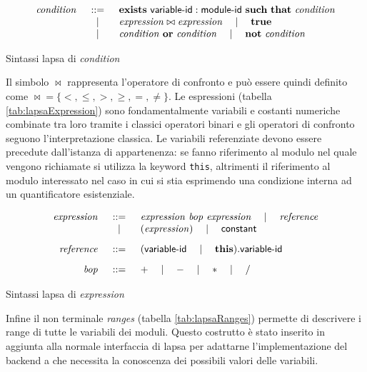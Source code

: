 \begin{table}[htbp!] %
$$
\begin{array}{rcl}
	\mathit{condition} &::=& \mathbf{exists} \mbox{ } {\sf variable}\textrm{-}{\sf id}:{\sf module}\textrm{-}{\sf id} \mbox{ } \mathbf{such}\mbox{ }\mathbf{that} \mbox{ } \mathit{condition} \\
		& \quad\mid\quad & \mathit{expression} \bowtie \mathit{expression} \quad\mid\quad \mathbf{true} \\
		& \quad\mid\quad & \mathit{condition} \mbox{ } \mathbf{or} \mbox{ } \mathit{condition} \quad\mid\quad \mathbf{not} \mbox{ } \mathit{condition}
		\\
\end{array}
$$
\caption{Sintassi \ac{lapsa} di \emph{condition}}
\label{tab:lapsaCondition}
\end{table}

Il simbolo $\bowtie$ rappresenta l'operatore di confronto e può essere quindi definito come $\bowtie = \{<,\leq,>,\geq, =, \neq\}$. Le espressioni (tabella \ref{tab:lapsaExpression}) sono fondamentalmente variabili e costanti numeriche combinate tra loro tramite i classici operatori binari e gli operatori di confronto seguono l'interpretazione classica.
Le variabili referenziate devono essere precedute dall'istanza di appartenenza: se fanno riferimento al modulo nel quale vengono richiamate si utilizza la keyword \texttt{this}, altrimenti il riferimento al modulo interessato nel caso in cui si stia esprimendo una condizione interna ad un quantificatore esistenziale.

\begin{table}[htbp!] %
$$
\begin{array}{rcl}
	\mathit{expression} &::=& \mathit{expression} \mbox{ } \mathit{bop} \mbox{ } \mathit{expression} \quad\mid\quad \mathit{reference} \\
	& \quad\mid\quad & (\mathit{expression}) \quad\mid\quad {\sf constant}
	\\[.3cm]
	\mathit{reference} &::=& ({\sf variable}\textrm{-}{\sf id} \quad\mid\quad \mathbf{this})\mathbf{.} {\sf variable}\textrm{-}{\sf id}
	\\[.3cm]
	\mathit{bop} &::=& + \quad\mid\quad - \quad\mid\quad * \quad\mid\quad \slash
	\\
\end{array}
$$
\caption{Sintassi \ac{lapsa} di \emph{expression}}
\label{tab:lapsaExpression}
\end{table}

Infine il non terminale \emph{ranges} (tabella \ref{tab:lapsaRanges}) permette di descrivere i range di tutte le variabili dei moduli. Questo costrutto è stato inserito in aggiunta alla normale interfaccia di \ac{lapsa} per adattarne l'implementazione del backend a \prism{} che necessita la conoscenza dei possibili valori delle variabili.

